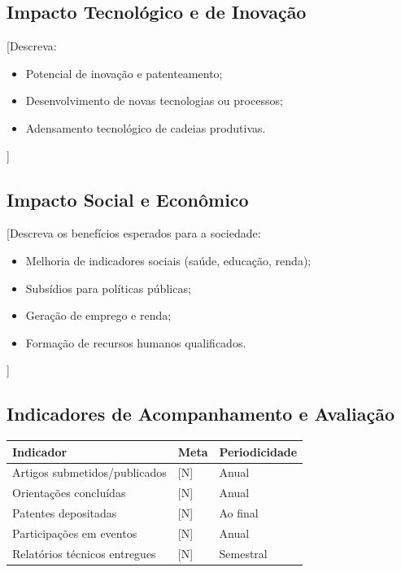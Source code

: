 \documentclass[
  12pt,
  a4paper,
  oneside,
  english,      %
  brazil
]{article}
\begin{document}
\subsection{Impacto Tecnológico e de Inovação}

[Descreva:
\begin{itemize}
  \item Potencial de inovação e patenteamento;
  \item Desenvolvimento de novas tecnologias ou processos;
  \item Adensamento tecnológico de cadeias produtivas.
\end{itemize}]

\subsection{Impacto Social e Econômico}

[Descreva os benefícios esperados para a sociedade:
\begin{itemize}
  \item Melhoria de indicadores sociais (saúde, educação, renda);
  \item Subsídios para políticas públicas;
  \item Geração de emprego e renda;
  \item Formação de recursos humanos qualificados.
\end{itemize}]

\subsection{Indicadores de Acompanhamento e Avaliação}

\begin{tabularx}{\textwidth}{lXX}
  \toprule
  \textbf{Indicador} & \textbf{Meta} & \textbf{Periodicidade} \\
  \midrule
  Artigos submetidos/publicados & [N] & Anual \\
  Orientações concluídas        & [N] & Anual \\
  Patentes depositadas          & [N] & Ao final \\
  Participações em eventos      & [N] & Anual \\
  Relatórios técnicos entregues & [N] & Semestral \\
  \bottomrule
\end{tabularx}

\newpage
\end{document}
